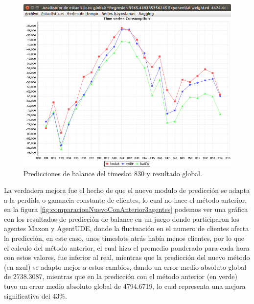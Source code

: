 \begin{figure}[h]
	\centering
	\includegraphics[width=12cm]{img/comparacionNuevoConAnterior1agente.png}
	\caption{Predicciones de balance del timeslot 830 y resultado global. }
	\label{fig:comparacionNuevoConAnterior1agente}
\end{figure}

La verdadera mejora fue el hecho de que el nuevo modulo de predicción se adapta a la perdida o ganancia constante de clientes, lo cual no hace el método anterior, en la figura \ref{fig:comparacionNuevoConAnterior3agentes} podemos ver una gráfica con los resultados de predicción de balance en un juego donde participaron los agentes Maxon y AgentUDE, donde la fluctuación en el numero de clientes afecta la predicción, en este caso, unos timeslots atrás había menos clientes, por lo que el calculo del método anterior, el cual hizo el promedio ponderado para cada hora con estos valores,  fue inferior al real, mientras que la predicción del nuevo método (en azul) se adapto mejor a estos cambios, dando un error medio absoluto global de 2738.3087, mientras que en la predicción con el método anterior (en verde) tuvo un error medio absoluto global de 4794.6719, lo cual representa una mejora significativa del 43\%.

